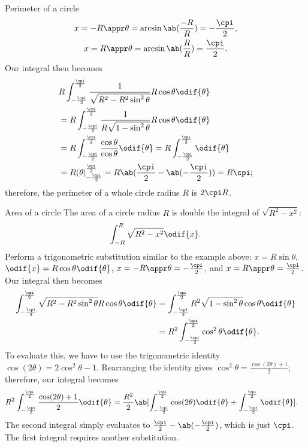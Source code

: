 \begin{exmp}{Perimeter of a circle}{}
	\begin{equation}
		\begin{gathered}
			x = -R \appr \theta = \arcsin\ab(\frac{-R}{R}) = -\frac{\cpi}{2}, \\
			x = R \appr \theta = \arcsin\ab(\frac{R}{R}) = \frac{\cpi}{2}.
		\end{gathered}
	\end{equation}
	Our integral then becomes
	\begin{align}
		 & R\int_{-\frac{\cpi}{2}}^{\frac{\cpi}{2}}\frac{1}{\sqrt{R^2 - R^2\sin^2\theta}}R\cos\theta\odif{\theta} \nonumber                             \\
		 & = R\int_{-\frac{\cpi}{2}}^{\frac{\cpi}{2}}\frac{1}{R\sqrt{1 - \sin^2\theta}}R\cos\theta\odif{\theta}                                         \\
		 & = R\int_{-\frac{\cpi}{2}}^{\frac{\cpi}{2}}\frac{\cos\theta}{\cos\theta}\odif{\theta} = R\int_{-\frac{\cpi}{2}}^{\frac{\cpi}{2}}\odif{\theta} \\
		 & = R(\theta|_{-\frac{\cpi}{2}}^{\frac{\cpi}{2}} = R\ab(\frac{\cpi}{2} - \ab(-\frac{\cpi}{2})) = R\cpi;
	\end{align}
	therefore, the perimeter of a whole circle radius $R$ is $2\cpi R$.
\end{exmp}
\begin{exmp}{Area of a circle}{}
	The area of a circle radius $R$ is double the integral of $\sqrt{R^2 - x^2}$:
	\begin{equation}
		\int_{-R}^{R}\sqrt{R^2 - x^2}\odif{x}.
	\end{equation}
	Perform a trigonometric substitution similar to the example above: $x = R\sin\theta$, $\odif{x} = R\cos\theta\odif{\theta}$, $x = -R \appr \theta = -\frac{\cpi}{2}$, and $x = R \appr \theta = \frac{\cpi}{2}$. Our integral then becomes
	\begin{align}
		\int_{-\frac{\cpi}{2}}^{\frac{\cpi}{2}}\sqrt{R^2 - R^2\sin^2\theta}R\cos\theta\odif{\theta}
		 & = \int_{-\frac{\cpi}{2}}^{\frac{\cpi}{2}}R^2\sqrt{1 - \sin^2\theta}\cos\theta\odif{\theta} \nonumber \\
		 & = R^2\int_{-\frac{\cpi}{2}}^{\frac{\cpi}{2}}\cos^2\theta\odif{\theta}.
	\end{align}
	To evaluate this, we have to use the trigonometric identity $\cos(2\theta) = 2\cos^2\theta - 1$. Rearranging the identity gives $\cos^2\theta = \frac{\cos(2\theta) + 1}{2}$; therefore, our integral becomes
	\begin{align}
		R^2\int_{-\frac{\cpi}{2}}^{\frac{\cpi}{2}}\frac{\cos(2\theta) + 1}{2}\odif{\theta}
		 & = \frac{R^2}{2}\ab[\int_{-\frac{\cpi}{2}}^{\frac{\cpi}{2}}\cos(2\theta)\odif{\theta} + \int_{-\frac{\cpi}{2}}^{\frac{\cpi}{2}}\odif{\theta}].
	\end{align}
	The second integral simply evaluates to $\frac{\cpi}{2} - \ab(-\frac{\cpi}{2})$, which is just $\cpi$. The first integral requires another substitution.
\end{exmp}

